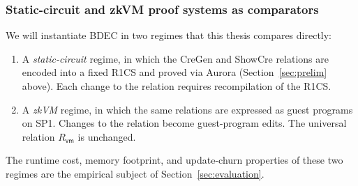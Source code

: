 \subsubsection{Static-circuit and zkVM proof systems as comparators}
We will instantiate BDEC in two regimes that this thesis compares directly:
\begin{enumerate}
  \item A \emph{static-circuit} regime, in which the CreGen and ShowCre relations are encoded into a fixed R1CS and proved via Aurora (Section~\ref{sec:prelim} above). Each change to the relation requires recompilation of the R1CS.
  \item A \emph{zkVM} regime, in which the same relations are expressed as guest programs on SP1. Changes to the relation become guest-program edits. The universal relation $R_{\mathsf{vm}}$ is unchanged.
\end{enumerate}
The runtime cost, memory footprint, and update-churn properties of these two regimes are the empirical subject of Section~\ref{sec:evaluation}.